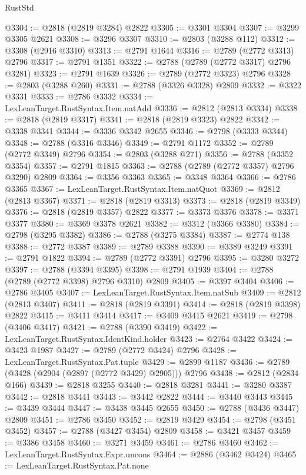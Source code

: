 \begin{lexlean}{RustStd}
\begin{coremodule}
@3304 := @2818 (@2819 @3284) @2822
@3305 := @3301 @3304
@3307 := @3299 @3305 @2621
@3308 := @3296 @3307
@3310 := @2803 (@3288 @112)
@3312 := @3308 (@2916 @3310)
@3313 := @2791 @1644
@3316 := @2789 (@2772 @3313) @2796
@3317 := @2791 @1351
@3322 := @2788 (@2789 (@2772 @3317) @2796 @3281)
@3323 := @2791 @1639
@3326 := @2789 (@2772 @3323) @2796
@3328 := @2803 (@3288 @260)
@3331 := @2788 (@3326 @3328) @2809
@3332 := @3322 @3331
@3333 := @2786 @3332
@3334 := LexLeanTarget.RustSyntax.Item.natAdd
@3336 := @2812 (@2813 @3334)
@3338 := @2818 (@2819 @3317)
@3341 := @2818 (@2819 @3323) @2822
@3342 := @3338 @3341
@3344 := @3336 @3342 @2655
@3346 := @2798 (@3333 @3344)
@3348 := @2788 (@3316 @3346)
@3349 := @2791 @1172
@3352 := @2789 (@2772 @3349) @2796
@3354 := @2803 (@3288 @271)
@3356 := @2788 (@3352 @3354)
@3357 := @2791 @1815
@3363 := @2788 (@2789 (@2772 @3357) @2796 @3290) @2809
@3364 := @3356 @3363
@3365 := @3348 @3364
@3366 := @2786 @3365
@3367 := LexLeanTarget.RustSyntax.Item.natQuot
@3369 := @2812 (@2813 @3367)
@3371 := @2818 (@2819 @3313)
@3373 := @2818 (@2819 @3349)
@3376 := @2818 (@2819 @3357) @2822
@3377 := @3373 @3376
@3378 := @3371 @3377
@3380 := @3369 @3378 @2621
@3382 := @3312 (@3366 @3380)
@3384 := @2798 (@3295 @3382)
@3386 := @2788 (@3275 @3384)
@3387 := @2774 @138
@3388 := @2772 @3387
@3389 := @2789 @3388
@3390 := @3389 @3249
@3391 := @2791 @1822
@3394 := @2789 (@2772 @3391) @2796
@3395 := @3280 @3272
@3397 := @2788 (@3394 @3395)
@3398 := @2791 @1939
@3404 := @2788 (@2789 (@2772 @3398) @2796 @3310) @2809
@3405 := @3397 @3404
@3406 := @2786 @3405
@3407 := LexLeanTarget.RustSyntax.Item.natSub
@3409 := @2812 (@2813 @3407)
@3411 := @2818 (@2819 @3391)
@3414 := @2818 (@2819 @3398) @2822
@3415 := @3411 @3414
@3417 := @3409 @3415 @2621
@3419 := @2798 (@3406 @3417)
@3421 := @2788 (@3390 @3419)
@3422 := LexLeanTarget.RustSyntax.IdentKind.holder
@3423 := @2764 @3422
@3424 := @3423 @1987
@3427 := @2789 (@2772 @3424) @2796
@3428 := LexLeanTarget.RustSyntax.Pat.tuple
@3429 := @2899 @1187
@3436 := @2789 (@3428 (@2904 (@2897 (@2772 @3429) @2905))) @2796
@3438 := @2812 (@2834 @166)
@3439 := @2818 @3255
@3440 := @2818 @3281
@3441 := @3280 @3387
@3442 := @2818 @3441
@3443 := @3442 @2822
@3444 := @3440 @3443
@3445 := @3439 @3444
@3447 := @3438 @3445 @2655
@3450 := @2788 (@3436 @3447) @2809
@3451 := @2786 @3450
@3452 := @2819 @3429
@3454 := @2798 (@3451 @3452)
@3457 := @2788 (@3427 @3454) @2809
@3458 := @3421 @3457
@3459 := @3386 @3458
@3460 := @3271 @3459
@3461 := @2786 @3460
@3462 := LexLeanTarget.RustSyntax.Expr.uncons
@3464 := @2886 (@3462 @3424)
@3465 := LexLeanTarget.RustSyntax.Pat.none

\end{coremodule}
\end{lexlean}
